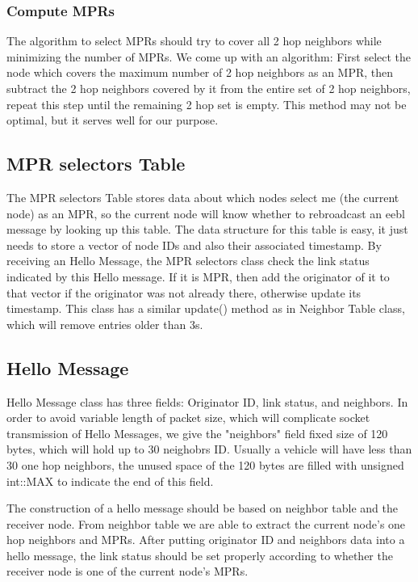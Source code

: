 \documentclass[twocolumn]{article}
\begin{document}
\subsubsection{Compute MPRs}
\par{The algorithm to select MPRs should try to cover all 2 hop neighbors while minimizing the number of MPRs. We come up with an algorithm: First select the node which covers the maximum number of 2 hop neighbors as an MPR, then subtract the 2 hop neighbors covered by it from the entire set of 2 hop neighbors, repeat this step until the remaining 2 hop set is empty. This method may not be optimal, but it serves well for our purpose.}
\subsection{MPR selectors Table}

\par{The MPR selectors Table stores data about which nodes select me (the current node) as an MPR, so the current node will know whether to rebroadcast an eebl message by looking up this table. The data structure for this table is easy, it just needs to store a vector of node IDs and also their associated timestamp. By receiving an Hello Message, the MPR selectors class check the link status indicated by this Hello message. If it is MPR, then add the originator of it to that vector if the originator was not already there, otherwise update its timestamp. This class has a similar update() method as in Neighbor Table class, which will remove entries older than 3s.}
\subsection{Hello Message}

\par{Hello Message class has three fields: Originator ID, link status, and neighbors. In order to avoid variable length of packet size, which will complicate socket transmission of Hello Messages, we give the "neighbors" field fixed size of 120 bytes, which will hold up to 30 neighobrs ID. Usually a vehicle will have less than 30 one hop neighbors, the unused space of the 120 bytes are filled with unsigned int::MAX to indicate the end of this field.  
}
\par{The construction of a hello message should be based on neighbor table and the receiver node. From neighbor table we are able to extract the current node's one hop neighbors and MPRs. After putting originator ID and neighbors data into a hello message, the link status should be set properly according to whether the receiver node is one of the current node's MPRs. 
}
\end{document}
